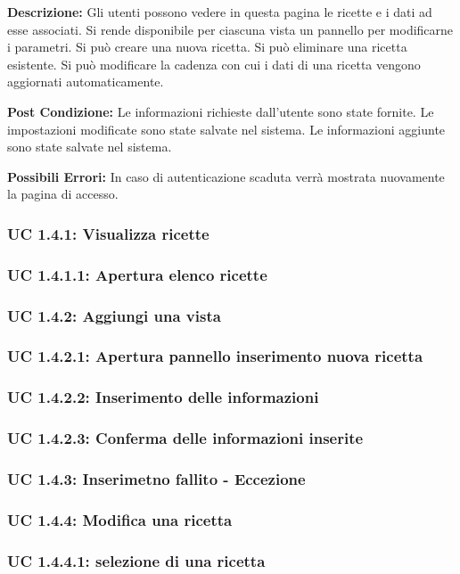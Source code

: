 \textbf{Descrizione:}
Gli utenti possono vedere in questa pagina le ricette e i dati ad esse associati. 
Si rende disponibile per ciascuna vista un pannello per modificarne i parametri. 
Si può creare una nuova ricetta. 
Si può eliminare una ricetta esistente.
Si può modificare la cadenza con cui i dati di una ricetta vengono aggiornati automaticamente.

\textbf{Post Condizione:}
Le informazioni richieste dall'utente sono state fornite.
Le impostazioni modificate sono state salvate nel sistema.
Le informazioni aggiunte sono state salvate nel sistema.

\textbf{Possibili Errori:}
In caso di autenticazione scaduta verrà mostrata nuovamente la pagina di accesso.

\subsubsection{UC 1.4.1: Visualizza ricette}
\subsubsection{UC 1.4.1.1: Apertura elenco ricette}
\subsubsection{UC 1.4.2: Aggiungi una vista}
\subsubsection{UC 1.4.2.1: Apertura pannello inserimento nuova ricetta}
\subsubsection{UC 1.4.2.2: Inserimento delle informazioni }
\subsubsection{UC 1.4.2.3: Conferma delle informazioni inserite}
\subsubsection{UC 1.4.3: Inserimetno fallito - Eccezione}
\subsubsection{UC 1.4.4: Modifica una ricetta}
\subsubsection{UC 1.4.4.1: selezione di una ricetta}
